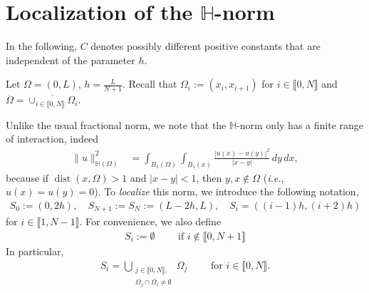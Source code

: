 \documentclass[10 pt]{article}
\newcommand\inter[1]{\llbracket #1\rrbracket}
\numberwithin{equation}{section}
\def\dist{\operatorname{dist}}
\begin{document}
\section{Localization of the $\mathbb{H}$-norm}\label{sec:localization-norm}

In the following, $C$ denotes possibly different positive constants that are independent of the parameter $h$. 

Let $\Omega=(0,L)$, $h=\frac{L}{N+1}$. Recall that $\Omega_i:=(x_{i},x_{i+1})$ for $i\in\inter{0,N}$ and $\overline{\Omega}=\overline{\cup_{i\in\inter{0,N}}\Omega_i}$. 

Unlike the usual fractional norm, we note that the $\mathbb H$-norm only has a finite range of interaction, indeed
%
\begin{align}\label{eq:norm_R_bound}
    \|u\|^2_{\mathbb H(\Omega)} &=\int_{B_1(\Omega)}\int_{B_1(x)}\frac{|u(x)-u(y)|^2}{|x-y|}\, dy\, dx,
\end{align}
%
because if $\dist(x,\Omega)>1$ and $|x-y|<1$, then $y,x\not\in \Omega$ (\emph{i.e.}, $u(x)=u(y)=0$).  To \emph{localize} this norm, we introduce the following notation,
\begin{align}\label{eq:def_Si}
S_0:=(0,2h),\quad S_{N+1}:=S_{N}:=(L-2h,L),\quad S_{i}=((i-1)h,(i+2)h)
\end{align}
for $i\in \inter{1,N-1}$.  For convenience, we also define 
\begin{align*}
S_i:=\emptyset \qquad \text{ if }i\not\in\inter{0,N+1}
\end{align*}
In particular, 
\begin{align*}
    S_i=\bigcup_
    {
    {\substack{j\in\inter{0,N},\\ \overline{\Omega_j}\cap \overline{\Omega_i}\neq \emptyset}}
    }\Omega_j \qquad \text{ for } i\in\inter{0,N}.
\end{align*}
\end{document}
